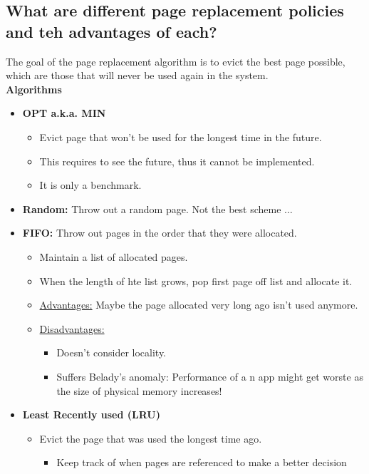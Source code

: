 \documentclass[a4paper]{article}
\begin{document}
\subsection{What are different page replacement policies and teh advantages of each?} %
\label{sub:What are different page replacement policies and teh advantages of each?}
The goal of the page replacement algorithm is to evict the best page possible, which are those that will never be used
again in the system. \\ 
{\bf Algorithms} 
\begin{itemize}
  \item {\bf OPT a.k.a. MIN}
    \begin{itemize}
      \item Evict page that won't be used for the longest time in the future.
      \item This requires to see the future, thus it cannot be implemented.
      \item It is only a benchmark.
    \end{itemize}
  \item {\bf Random:} Throw out a random page. Not the best scheme $\dots$
  \item {\bf FIFO:} Throw out pages in the order that they were allocated.
    \begin{itemize}
      \item Maintain a list of allocated pages.   
      \item When the length of hte list grows, pop first page off list and allocate it.
      \item \underline{Advantages:} Maybe the page allocated very long ago isn't used anymore.
      \item \underline{Disadvantages:}
        \begin{itemize}
          \item Doesn't consider locality.
          \item Suffers Belady's anomaly: Performance of a n app might get worste as the size of physical memory increases!
        \end{itemize}
    \end{itemize}
  \item {\bf Least Recently used (LRU)}
    \begin{itemize}
      \item Evict the page that was used the longest time ago.
        \begin{itemize}
          \item Keep track of when pages are referenced to make a better decision

\end{itemize}
\end{itemize}
\end{itemize}
\end{document}
